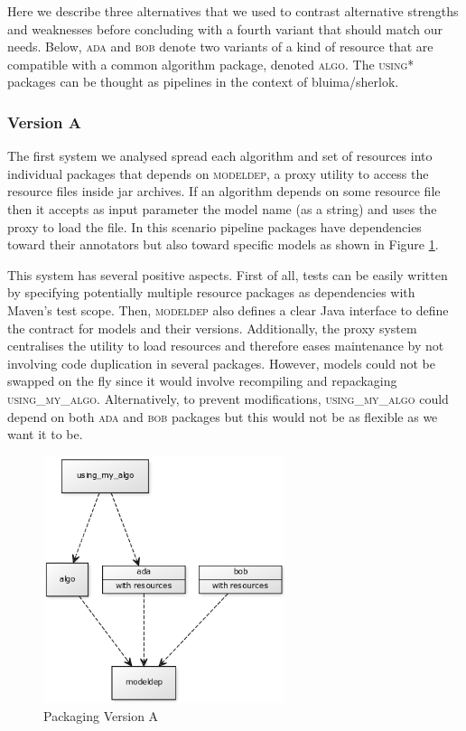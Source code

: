 \documentclass{article}
\newcommand{\ID}[1]{{\textsc{#1}}}
\begin{document}
Here we describe three alternatives that we used to contrast alternative strengths and weaknesses before concluding with a fourth variant that should match our needs. Below, \ID{ada} and \ID{bob} denote two variants of a kind of resource that are compatible with a common algorithm package, denoted \ID{algo}. The \ID{using*} packages can be thought as pipelines in the context of bluima/sherlok.

\subsubsection{Version A}

The first system we analysed spread each algorithm and set of resources into individual packages that depends on \ID{modeldep}, a proxy utility to access the resource files inside jar archives. If an algorithm depends on some resource file then it accepts as input parameter the model name (as a string) and uses the proxy to load the file. In this scenario pipeline packages have dependencies toward their annotators but also toward specific models as shown in Figure \ref{fig:pkgsysA}.

This system has several positive aspects. First of all, tests can be easily written by specifying potentially multiple resource packages as dependencies with Maven's test scope. Then, \ID{modeldep} also defines a clear Java interface to define the contract for models and their versions. Additionally, the proxy system centralises the utility to load resources and therefore eases maintenance by not involving code duplication in several packages. However, models could not be swapped on the fly since it would involve recompiling and repackaging \ID{using\_my\_algo}.  Alternatively, to prevent modifications, \ID{using\_my\_algo} could depend on both \ID{ada} and \ID{bob} packages but this would not be as flexible as we want it to be.

\begin{figure}
\centering
\includegraphics[width=200pt]{res/packaging_version_A.png}
\caption{Packaging Version A}
\label{fig:pkgsysA}
\end{figure}
\end{document}
